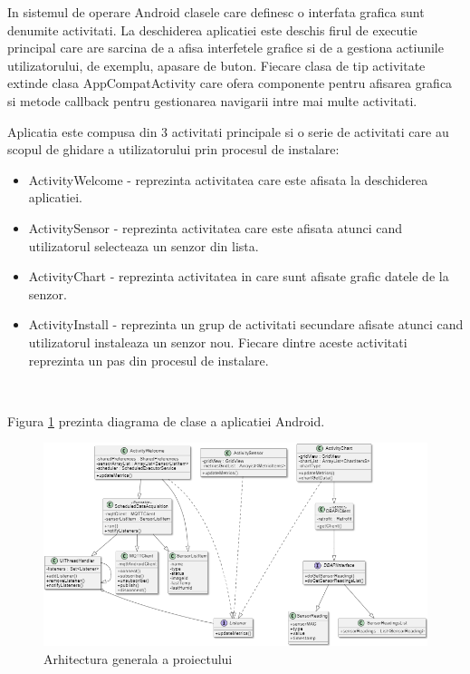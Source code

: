 In sistemul de operare Android clasele care definesc o interfata grafica sunt denumite activitati. La deschiderea aplicatiei este deschis firul de executie principal 
care are sarcina de a afisa interfetele grafice si de a gestiona actiunile utilizatorului, de exemplu, apasare de buton. Fiecare clasa de tip activitate extinde 
clasa AppCompatActivity care ofera componente pentru afisarea grafica si metode callback pentru gestionarea navigarii intre mai multe activitati. 

Aplicatia este compusa din 3 activitati principale si o serie de activitati care au scopul de ghidare a utilizatorului prin procesul de instalare:
\begin{itemize}
	\item ActivityWelcome - reprezinta activitatea care este afisata la deschiderea aplicatiei.
	\item ActivitySensor - reprezinta activitatea care este afisata atunci cand utilizatorul selecteaza un senzor din lista.
	\item ActivityChart - reprezinta activitatea in care sunt afisate grafic datele de la senzor.
	\item ActivityInstall - reprezinta un grup de activitati secundare afisate atunci cand utilizatorul instaleaza un senzor nou. Fiecare dintre aceste 
	activitati reprezinta un pas din procesul de instalare.
\end{itemize}

\

Figura \ref{fig:AndroidClassDiagram} prezinta diagrama de clase a aplicatiei Android.
\begin{figure}[H]
    \centering
    \includegraphics[scale=0.68]{figs/AndroidClassDiagram.png}
    \caption{Arhitectura generala a proiectului}
    \label{fig:AndroidClassDiagram}
\end{figure}

